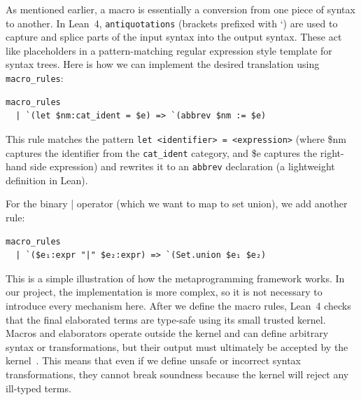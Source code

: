 As mentioned earlier, a macro is essentially a conversion from one piece of syntax to another. In Lean~4, \texttt{antiquotations} (brackets prefixed with `) are used to capture and splice parts of the input syntax into the output syntax. These act like placeholders in a pattern-matching regular expression style template for syntax trees. Here is how we can implement the desired translation using \texttt{macro\_rules}:

\begin{verbatim}
macro_rules
  | `(let $nm:cat_ident = $e) => `(abbrev $nm := $e)
\end{verbatim}

This rule matches the pattern \texttt{let <identifier> = <expression>} (where \$nm captures the identifier from the \texttt{cat\_ident} category, and \$e captures the right-hand side expression) and rewrites it to an \texttt{abbrev} declaration (a lightweight definition in Lean).

For the binary | operator (which we want to map to set union), we add another rule:

\begin{verbatim}
macro_rules
  | `($e₁:expr "|" $e₂:expr) => `(Set.union $e₁ $e₂)
\end{verbatim}

This is a simple illustration of how the metaprogramming framework works. In our project, the implementation is more complex, so it is not necessary to introduce every mechanism here. After we define the macro rules, Lean~4 checks that the final elaborated terms are type-safe using its small trusted kernel. Macros and elaborators operate outside the kernel and can define arbitrary syntax or transformations, but their output must ultimately be accepted by the kernel~\citep{deMoura2021lean4}. This means that even if we define unsafe or incorrect syntax transformations, they cannot break soundness because the kernel will reject any ill-typed terms.

